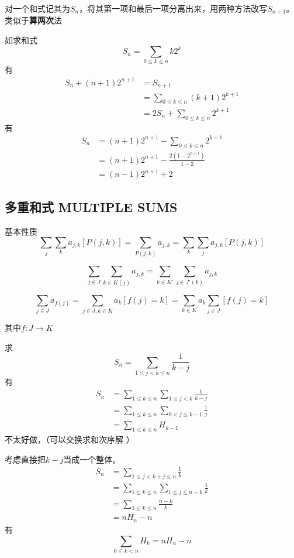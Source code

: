 对一个和式记其为$S_n$，将其第一项和最后一项分离出来，用两种方法改写$S_{n+1}$。\\

类似于\textbf{算两次}法

\begin{example}
  如求和式
  $$
  S_n=\sum_{0\le k \le n} k2^k
  $$
  有
  $$
  \begin{aligned}
  S_n+(n+1)2^{n+1}&=S_{n+1}\\
  &=\sum_{0 \le k \le n}(k+1)2^{k+1}\\
  &=2S_n+\sum_{0\le k \le n} 2^{k+1}
  \end{aligned}
  $$
  有
  $$
  \begin{aligned}
  S_n&=(n+1)2^{n+1}-\sum_{0 \le k \le n} 2^{k+1}\\
  &=(n+1)2^{n+1}-\frac{2(1-2^{n+1})}{1-2}\\
  &=(n-1)2^{n+1}+2
  \end{aligned}
  $$
\end{example}

\subsection{多重和式 MULTIPLE SUMS }

基本性质
$$
\sum_j\sum_ka_{j,k}[P(j,k)]=\sum_{P(j,k)}a_{j,k}=\sum_{k}\sum_ja_{j,k}[P(j,k)]
$$

$$
\sum_{j\in J}\sum_{k\in K(j)} a_{j,k} =\sum_{k\in K'}\sum_{j\in J'(k)} a_{j,k}
$$

$$
\sum_{j\in J}a_{f(j)}=\sum_{j\in J,k\in K} a_k[f(j)=k]=\sum_{k\in K} a_k \sum_{j\in J} [f(j)=k]
$$

其中$f: J\rightarrow K$

\begin{example}
  求
$$
S_n=\sum_{1\le j <k\le n}\frac{1}{k-j}
$$
有
$$
\begin{aligned}
S_n&=\sum_{1\le k \le n} \sum_{1\le j<k}\frac{1}{k-j}\\
&=\sum_{1\le k \le n} \sum_{0<j\le k-1}\frac{1}{j}\\
&=\sum_{1\le k \le n} H_{k-1}
\end{aligned}
$$
不太好做，（可以交换求和次序解 ）

考虑直接把$k-j$当成一个整体。
$$
\begin{aligned}
S_n&=\sum_{1\le j<k+j\le n}\frac{1}{k}\\
&=\sum_{1\le k \le n}\sum_{1\le j\le n-k} \frac{1}{k}\\
&=\sum_{1\le k \le n} \frac{n-k}{k}\\
&=nH_{n}-n
\end{aligned}
$$
有
$$
\sum_{0\le k <n} H_k=nH_{n}-n
$$
\end{example}

